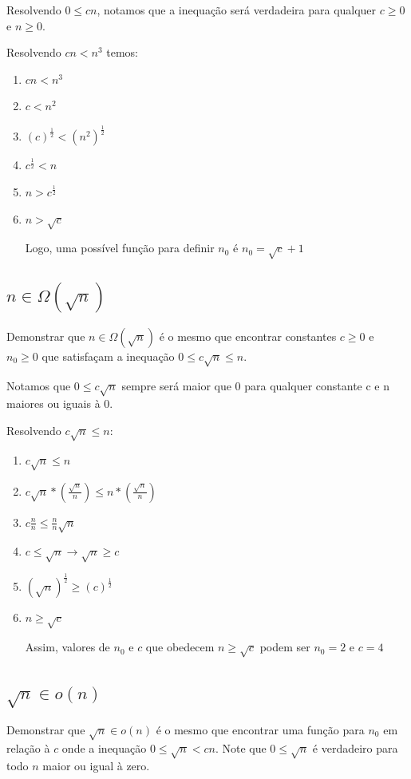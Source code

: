\documentclass[ a4paper, twocolumn]{article}
\theoremstyle{definition}
\begin{document}
Resolvendo $0 \leq cn$, notamos que a inequação será verdadeira para qualquer $c \geq 0$ e $n \geq 0$.

Resolvendo $cn < n^3$ temos:
\begin{enumerate}[Step 1:]
	\item $cn < n^3$
	\item $c < n^2$
	\item $(c)^\frac{1}{2} < (n^2)^\frac{1}{2}$
	\item $c^\frac{1}{2} < n$	
	\item $n > c^\frac{1}{2}$		
	\item $n > \sqrt{c}$
	
	Logo, uma possível função para definir $n_0$ é $n_0 = \sqrt{c} + 1$ 	
\end{enumerate}

\subsection{$n \in \Omega(\sqrt{n})$}
Demonstrar que $n \in \Omega(\sqrt{n})$ é o mesmo que encontrar constantes $c \geq 0$ e $n_0 \geq 0$ que satisfaçam a inequação $0 \leq c \sqrt{n} \leq n$.

Notamos que $0 \leq c \sqrt{n}$ sempre será maior que 0 para qualquer constante c e n maiores ou iguais à 0.

Resolvendo $c\sqrt{n} \leq n$:
\begin{enumerate}[Step 1:]
	\item $c\sqrt{n} \leq n$
	\item $c \sqrt{n} * (\frac{\sqrt{n}}{n}) \leq n * (\frac{\sqrt{n}}{n})$
	\item $c \frac{n}{n} \leq  \frac{n}{n} \sqrt{n}$
	\item $c \leq \sqrt{n} \rightarrow \sqrt{n} \geq c$
	\item $(\sqrt{n})^\frac{1}{2} \geq (c)^\frac{1}{2}$
	\item $n \geq \sqrt{c}$
	
	Assim, valores de $n_0$ e $c$ que obedecem $n \geq \sqrt{c}$ podem ser $n_0 = 2$ e $c = 4$
\end{enumerate}

\subsection{$\sqrt{n} \in o(n)$}
	Demonstrar que $\sqrt{n} \in o(n)$ é o mesmo que encontrar uma função para $n_0$ em relação à $c$ onde a inequação $0 \leq \sqrt{n} < cn$. Note que $0 \leq \sqrt{n}$ é verdadeiro para todo $n$ maior ou igual à zero.
	
\end{document}
